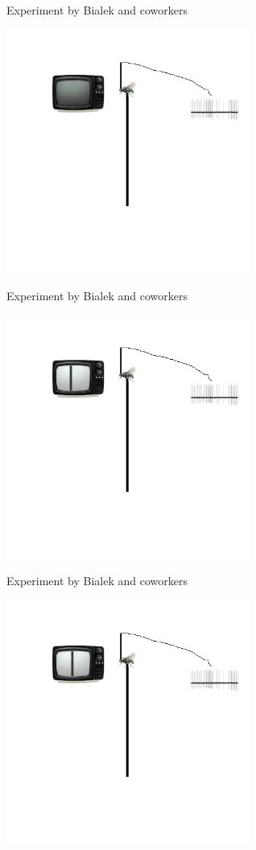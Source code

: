 \documentclass{beamer}
\begin{document}
\begin{frame}{Experiment by Bialek and coworkers}
  \begin{center}
    \includegraphics[width=8cm]{experiment1.jpg}
  \end{center}
\end{frame}
  

\begin{frame}{Experiment by Bialek and coworkers}
  \begin{center}
    \includegraphics[width=8cm]{experiment2.jpg}
  \end{center}
\end{frame}

\begin{frame}{Experiment by Bialek and coworkers}
  \begin{center}
    \includegraphics[width=8cm]{experiment3.jpg}
  \end{center}
\end{frame}
\end{document}

